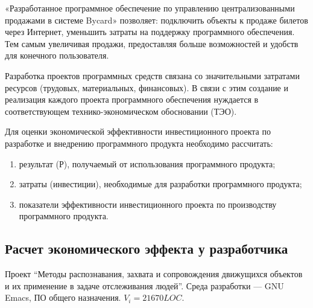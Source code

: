 «Разработанное программное обеспечение по управлению централизованными продажами в системе Bycard» позволяет: подключить объекты к продаже билетов через Интернет, уменьшить затраты на поддержку программного обеспечения. Тем самым увеличивая продажи, предоставляя больше возможностей и удобств для конечного пользователя.

Разработка проектов программных средств связана со значительными затратами ресурсов (трудовых, материальных, финансовых). В связи с этим создание и реализация каждого проекта программного обеспечения нуждается в соответствующем технико-экономическом обосновании (ТЭО).

Для оценки экономической эффективности инвестиционного проекта по разработке и внедрению программного продукта необходимо рассчитать:
\begin{enumerate}
    \item результат (Р), получаемый от использования программного продукта;
    \item затраты (инвестиции), необходимые для разработки программного продукта;
    \item показатели эффективности инвестиционного проекта по производству программного продукта.
\end{enumerate}

\subsection{Расчет экономического эффекта у разработчика}
Проект ``Методы распознавания, захвата и сопровождения движущихся объектов и их применение в задаче отслеживания людей''. Среда разработки --- GNU Emacs, ПО общего назначения. \( V_i = 21670 LOC \).

